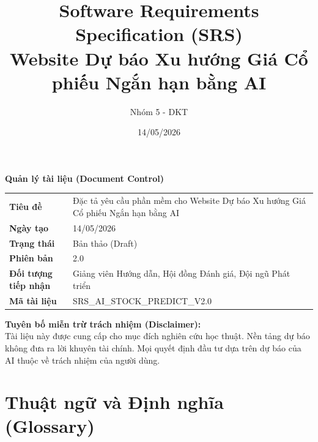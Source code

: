 \documentclass[12pt, a4paper]{article}
\title{\textbf{Software Requirements Specification (SRS)}\\ Website Dự báo Xu hướng Giá Cổ phiếu Ngắn hạn bằng AI}
\author{Nhóm 5 - DKT}
\date{14/05/2026}
\begin{document}
\maketitle
\thispagestyle{empty}

\noindent\textbf{Quản lý tài liệu (Document Control)}

\begin{table}[htbp]
    \centering
    \renewcommand{\arraystretch}{1.5}
    \begin{tabularx}{\textwidth}{|l|X|}
        \hline
        \rowcolor{cyan!15}
        \multicolumn{2}{|l|}{\textbf{Thông tin tài liệu}}                                                                \\
        \hline
        \textbf{Tiêu đề}             & Đặc tả yêu cầu phần mềm cho Website Dự báo Xu hướng Giá Cổ phiếu Ngắn hạn bằng AI \\
        \hline
        \textbf{Ngày tạo}            & 14/05/2026                                                                        \\
        \hline
        \textbf{Trạng thái}          & Bản thảo (Draft)                                                                  \\
        \hline
        \textbf{Phiên bản}           & 2.0                                                                               \\
        \hline
        \textbf{Đối tượng tiếp nhận} & Giảng viên Hướng dẫn, Hội đồng Đánh giá, Đội ngũ Phát triển                       \\
        \hline
        \textbf{Mã tài liệu}         & SRS\_AI\_STOCK\_PREDICT\_V2.0                                                     \\
        \hline
    \end{tabularx}
\end{table}

\noindent\textbf{Tuyên bố miễn trừ trách nhiệm (Disclaimer):}\\
Tài liệu này được cung cấp cho mục đích nghiên cứu học thuật. Nền tảng dự báo không đưa ra lời khuyên tài chính. Mọi quyết định đầu tư dựa trên dự báo của AI thuộc về trách nhiệm của người dùng.

\newpage
\tableofcontents
\newpage

\section*{Thuật ngữ và Định nghĩa (Glossary)}
\end{document}
